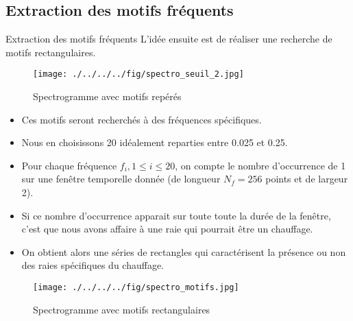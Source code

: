 \documentclass{beamer}
\begin{document}
\subsection{Extraction des motifs fréquents}
\begin{frame}{Extraction des motifs fréquents}
L'idée ensuite est de réaliser une recherche de motifs rectangulaires.

\begin{figure}[!h]
\begin{center}
\texttt{[image: ./../../../fig/spectro\_seuil\_2.jpg]}
\caption{Spectrogramme avec motifs repérés}
\label{Figure5}
\end{center}
\end{figure}
\end{frame}

\begin{frame}
\begin{itemize}
	\item Ces motifs seront recherchés à des fréquences spécifiques. 			\item Nous en choisissons 20 idéalement reparties entre 0.025 et 0.25.
	\item Pour chaque fréquence $f_i, 1\le i \le 20$, on compte le nombre d'occurrence de 1 sur une fenêtre temporelle donnée (de longueur $N_f = 256$ points et de largeur 2).
	\item Si ce nombre d'occurrence apparait sur toute toute la durée de la fenêtre, c'est que nous avons affaire à une raie qui pourrait être un chauffage.
	\item On obtient alors une séries de rectangles qui caractérisent la présence ou non des raies spécifiques du chauffage.
\end{itemize}
\end{frame}

\begin{frame}
\begin{figure}[!h]
\begin{center}
\texttt{[image: ./../../../fig/spectro\_motifs.jpg]}
\caption{Spectrogramme avec motifs rectangulaires}
\label{Figure6}
\end{center}
\end{figure}
\end{frame}
\end{document}
